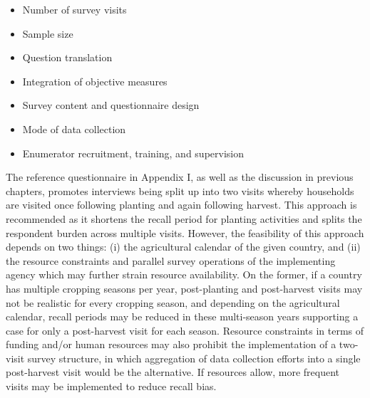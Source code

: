 \documentclass[
]{book}
\begin{document}
\begin{itemize}
\item
  Number of survey visits
\item
  Sample size
\item
  Question translation
\item
  Integration of objective measures
\item
  Survey content and questionnaire design
\item
  Mode of data collection
\item
  Enumerator recruitment, training, and supervision
\end{itemize}

The reference questionnaire in Appendix I, as well as the discussion in previous chapters, promotes interviews being split up into two visits whereby households are visited once following planting and again following harvest. This approach is recommended as it shortens the recall period for planting activities and splits the respondent burden across multiple visits. However, the feasibility of this approach depends on two things: (i) the agricultural calendar of the given country, and (ii) the resource constraints and parallel survey operations of the implementing agency which may further strain resource availability. On the former, if a country has multiple cropping seasons per year, post-planting and post-harvest visits may not be realistic for every cropping season, and depending on the agricultural calendar, recall periods may be reduced in these multi-season years supporting a case for only a post-harvest visit for each season. Resource constraints in terms of funding and/or human resources may also prohibit the implementation of a two-visit survey structure, in which aggregation of data collection efforts into a single post-harvest visit would be the alternative. If resources allow, more frequent visits may be implemented to reduce recall bias.
\end{document}
